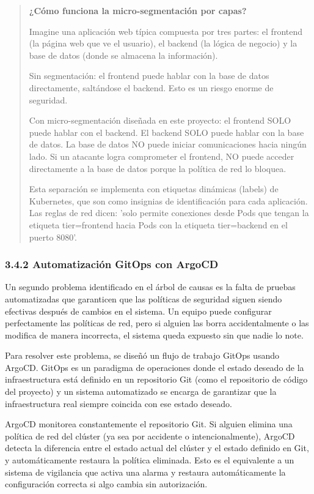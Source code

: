 \documentclass[journal]{IEEEtran}
\begin{document}
\begin{quote}
\textbf{¿Cómo funciona la micro-segmentación por capas?}

Imagine una aplicación web típica compuesta por tres partes: el frontend (la página web que ve el usuario), el backend (la lógica de negocio) y la base de datos (donde se almacena la información).

Sin segmentación: el frontend puede hablar con la base de datos directamente, saltándose el backend. Esto es un riesgo enorme de seguridad.

Con micro-segmentación diseñada en este proyecto: el frontend SOLO puede hablar con el backend. El backend SOLO puede hablar con la base de datos. La base de datos NO puede iniciar comunicaciones hacia ningún lado. Si un atacante logra comprometer el frontend, NO puede acceder directamente a la base de datos porque la política de red lo bloquea.

Esta separación se implementa con etiquetas dinámicas (labels) de Kubernetes, que son como insignias de identificación para cada aplicación. Las reglas de red dicen: 'solo permite conexiones desde Pods que tengan la etiqueta tier=frontend hacia Pods con la etiqueta tier=backend en el puerto 8080'.
\end{quote}

\subsubsection{3.4.2 Automatización GitOps con ArgoCD}

Un segundo problema identificado en el árbol de causas es la falta de pruebas automatizadas que garanticen que las políticas de seguridad siguen siendo efectivas después de cambios en el sistema. Un equipo puede configurar perfectamente las políticas de red, pero si alguien las borra accidentalmente o las modifica de manera incorrecta, el sistema queda expuesto sin que nadie lo note.

Para resolver este problema, se diseñó un flujo de trabajo GitOps usando ArgoCD. GitOps es un paradigma de operaciones donde el estado deseado de la infraestructura está definido en un repositorio Git (como el repositorio de código del proyecto) y un sistema automatizado se encarga de garantizar que la infraestructura real siempre coincida con ese estado deseado.

ArgoCD monitorea constantemente el repositorio Git. Si alguien elimina una política de red del clúster (ya sea por accidente o intencionalmente), ArgoCD detecta la diferencia entre el estado actual del clúster y el estado definido en Git, y automáticamente restaura la política eliminada. Esto es el equivalente a un sistema de vigilancia que activa una alarma y restaura automáticamente la configuración correcta si algo cambia sin autorización.
\end{document}
